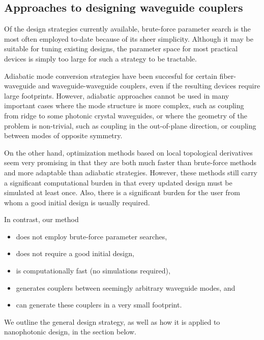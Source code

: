\documentclass[letterpaper,10pt]{article}
\begin{document}
\subsection{Approaches to designing waveguide couplers}
Of the design strategies currently available,
    brute-force parameter search is the most often employed 
    to-date because of its sheer simplicity\cite{}.
Although it may be suitable for tuning existing designs\cite{},
    the parameter space for most practical devices is simply too large
    for such a strategy to be tractable.

Adiabatic mode conversion strategies have been succesful
    for certain fiber-waveguide\cite{} and waveguide-waveguide\cite{} couplers,
    even if the resulting devices require large footprints.
However, adiabatic approaches cannot be used in many important cases 
    where the mode structure is more complex, such as
    coupling from ridge to some photonic crystal waveguides\cite{},
    or where the geometry of the problem is non-trivial, such as
    coupling in the out-of-plane direction, or
    coupling between modes of opposite symmetry.

On the other hand, optimization methods based on local topological derivatives 
    seem very promising\cite{}
    in that they are both much faster than brute-force methods and
    more adaptable than adiabatic strategies.
However, these methods still carry a significant computational burden 
    in that every updated design must be simulated at least once.
Also, there is a significant burden for the user from whom
    a good initial design is usually required.


In contrast, our method
\begin{itemize}
    \item does not employ brute-force parameter searches,
    \item does not require a good initial design,
    \item is computationally fast (no simulations required),
    \item generates couplers between seemingly arbitrary waveguide modes, and
    \item can generate these couplers in a very small footprint. 
\end{itemize}
We outline the general design strategy,
    as well as how it is applied to nanophotonic design, in the section below.
\end{document}
